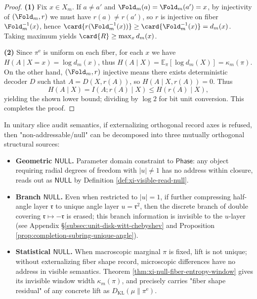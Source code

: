\begin{proof}
\textbf{(1)} Fix \(x\in X_m\). If \(a\neq a'\) and \(\Fold_m(a)=\Fold_m(a')=x\), by injectivity of \((\Fold_m,r)\) we must have \(r(a)\neq r(a')\), so \(r\) is injective on fiber \(\Fold_m^{-1}(x)\), hence \(\card{r(\Fold_m^{-1}(x))}\ge \card{\Fold_m^{-1}(x)}=d_m(x)\). Taking maximum yields \(\card{R}\ge \max_x d_m(x)\).
\par
\textbf{(2)} Since \(\pi^{\mathrm{e}}\) is uniform on each fiber, for each \(x\) we have
\(
H(A\mid X=x)=\log d_m(x)
\), thus
\(
H(A\mid X)=\mathbb{E}_\pi[\log d_m(X)]=\kappa_m(\pi)
\).
On the other hand, \((\Fold_m,r)\) injective means there exists deterministic decoder \(D\) such that \(A=D(X,r(A))\), so \(H(A\mid X,r(A))=0\).
Thus
\[
H(A\mid X)=I(A;r(A)\mid X)\le H(r(A)\mid X),
\]
yielding the shown lower bound; dividing by \(\log 2\) for bit unit conversion. This completes the proof.
\end{proof}

\begin{remark}\label{rem:xi-null-three-kinds}
In unitary slice audit semantics, if externalizing orthogonal record axes is refused, then "non-addressable/null" can be decomposed into three mutually orthogonal structural sources:
\begin{itemize}
  \item \textbf{Geometric \(\mathsf{NULL}\).} Parameter domain constraint to \(\mathsf{Phase}\): any object requiring radial degrees of freedom with \(|u|\neq 1\) has no address within closure, reads out as \(\mathsf{NULL}\) by Definition \ref{def:xi-visible-read-null}.
  \item \textbf{Branch \(\mathsf{NULL}\).} Even when restricted to \(|u|=1\), if further compressing half-angle layer \(\mathfrak r\) to unique angle layer \(u=\mathfrak r^2\), then the discrete branch of double covering \(\mathfrak r\mapsto-\mathfrak r\) is erased; this branch information is invisible to the \(u\)-layer (see Appendix \S\ref{subsec:unit-disk-witt-chebyshev} and Proposition \ref{prop:completion-subring-unique-angle}).
  \item \textbf{Statistical \(\mathsf{NULL}\).} When macroscopic marginal \(\pi\) is fixed, lift is not unique; without externalizing fiber shape record, microscopic differences have no address in visible semantics. Theorem \ref{thm:xi-null-fiber-entropy-window} gives its invisible window width \(\kappa_m(\pi)\), and precisely carries "fiber shape residual" of any concrete lift as \(D_{\mathrm{KL}}(\mu\|\pi^{\mathrm{e}})\).
\end{itemize}
\end{remark}

